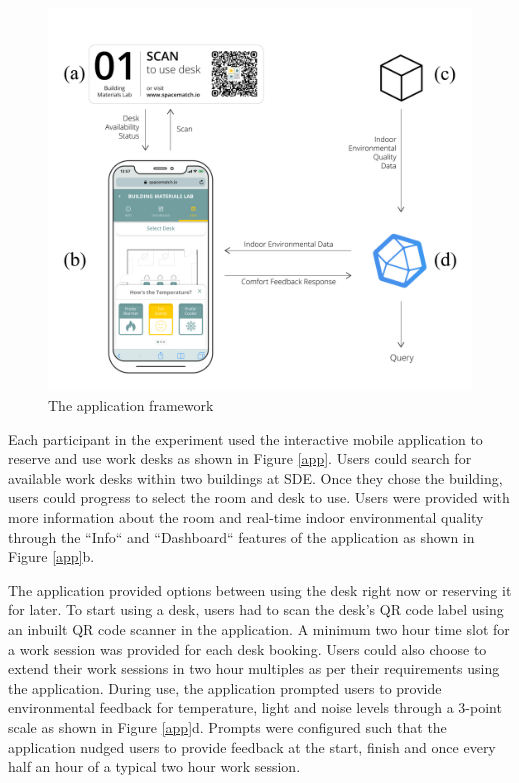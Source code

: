 \documentclass[]{interact}
\theoremstyle{plain}%
\theoremstyle{definition}
\theoremstyle{remark}
\begin{document}
\begin{figure}
\centering
\includegraphics[scale=0.1]{figures/framework.jpg}
\caption{The application framework} 
\label{framework}
\end{figure}

Each participant in the experiment used the interactive mobile application to reserve and use work desks as shown in Figure \ref{app}. Users could search for available work desks within two buildings at SDE. Once they chose the building, users could progress to select the room and desk to use. Users were provided with more information about the room and real-time indoor environmental quality through the ``Info`` and ``Dashboard`` features of the application as shown in Figure \ref{app}b. 

The application provided options between using the desk right now or reserving it for later. To start using a desk, users had to scan the desk's QR code label using an inbuilt QR code scanner in the application. A minimum two hour time slot for a work session was provided for each desk booking. Users could also choose to extend their work sessions in two hour multiples as per their requirements using the application. During use, the application prompted users to provide environmental feedback for temperature, light and noise levels through a 3-point scale as shown in Figure \ref{app}d. Prompts were configured such that the application nudged users to provide feedback at the start, finish and once every half an hour of a typical two hour work session. 
\end{document}
